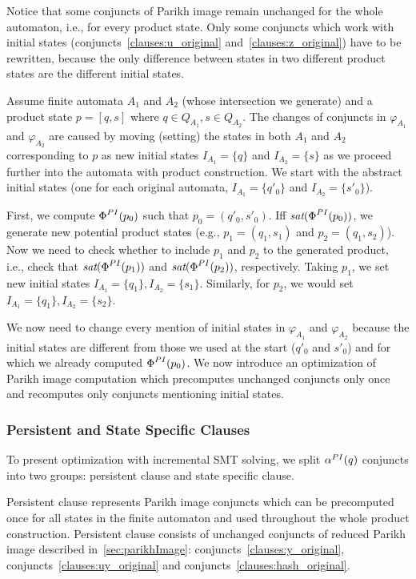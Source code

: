 Notice that some conjuncts of Parikh image remain unchanged for the whole automaton, i.e., for every product state. Only some conjuncts which work with initial states (conjuncts~\ref{clauses:u_original} and~\ref{clauses:z_original}) have to be rewritten, because the only difference between states in two different product states are the different initial states.

Assume finite automata $A_1$ and $A_2$ (whose intersection we generate) and a product state $p = [q, s]$ where $q \in Q_{A_1}, s \in Q_{A_2}$. The changes of conjuncts in $\varphi_{A_1}$ and $\varphi_{A_2}$ are caused by moving (setting) the states in both $A_1$ and $A_2$ corresponding to $p$ as new initial states $I_{A_1} = \{q\}$ and $I_{A_2} = \{s\}$ as we proceed further into the automata with product construction. We start with the abstract initial states (one for each original automata, $I_{A_1} = \{q'_0\}$ and $I_{A_2} = \{s'_0\}$).

First, we compute $\emph{$\Phi$}^{PI}(p_0)$ such that $p_0 = (q'_0,s'_0)$. Iff $\emph{sat}(\emph{$\Phi$}^{PI}(p_0))$, we generate new potential product states (e.g., $p_1 = (q_1, s_1)$ and $p_2 = (q_1, s_2)$). Now we need to check whether to include $p_1$ and $p_2$ to the generated product, i.e., check that $\emph{sat}(\emph{$\Phi$}^{PI}(p_1))$ and $\emph{sat}(\emph{$\Phi$}^{PI}(p_2))$, respectively. Taking $p_1$, we set new initial states $I_{A_1} = \{q_1\}, I_{A_2} = \{s_1\}$. Similarly, for $p_2$, we would set $I_{A_1} = \{q_1\}, I_{A_2} = \{s_2\}$.

We now need to change every mention of initial states in $\varphi_{A_1}$ and $\varphi_{A_2}$ because the initial states are different from those we used at the start ($q'_0$ and $s'_0$) and for which we already computed $\emph{$\Phi$}^{PI}(p_0)$. We now introduce an optimization of Parikh image computation which precomputes unchanged conjuncts only once and recomputes only conjuncts mentioning initial states.

\subsubsection{Persistent and State Specific Clauses}

To present optimization with incremental SMT solving, we split $\alpha^{PI}(q)$ conjuncts into two groups: persistent clause and state specific clause.

Persistent clause represents Parikh image conjuncts which can be precomputed once for all states in the finite automaton and used throughout the whole product construction. Persistent clause consists of unchanged conjuncts of reduced Parikh image described in~\ref{sec:parikhImage}: conjuncts~\ref{clauses:y_original}, conjuncts~\ref{clauses:uy_original} and conjuncts~\ref{clauses:hash_original}.

